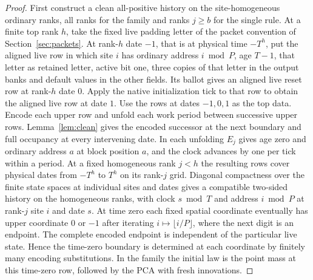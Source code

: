 \begin{proof}
First construct a clean all-positive history on the site-homogeneous ordinary ranks, all ranks for the family and ranks \(j\ge b\) for the single rule. At a finite top rank \(h\), take the fixed live padding letter of the packet convention of Section~\ref{sec:packets}. At rank-\(h\) date \(-1\), that is at physical time \(-T^h\), put the aligned live row in which site \(i\) has ordinary address \(i\bmod P\), age \(T-1\), that letter as retained letter, active bit one, three copies of that letter in the output banks and default values in the other fields. Its ballot gives an aligned live reset row at rank-\(h\) date \(0\). Apply the native initialization tick to that row to obtain the aligned live row at date \(1\). Use the rows at dates \(-1,0,1\) as the top data. Encode each upper row and unfold each work period between successive upper rows. Lemma~\ref{lem:clean} gives the encoded successor at the next boundary and full occupancy at every intervening date. In each unfolding \(E_j\) gives age zero and ordinary address \(a\) at block position \(a\), and the clock advances by one per tick within a period. At a fixed homogeneous rank \(j<h\) the resulting rows cover physical dates from \(-T^h\) to \(T^h\) on its rank-\(j\) grid. Diagonal compactness over the finite state spaces at individual sites and dates gives a compatible two-sided history on the homogeneous ranks, with clock \(s\bmod T\) and address \(i\bmod P\) at rank-\(j\) site \(i\) and date \(s\). At time zero each fixed spatial coordinate eventually has upper coordinate \(0\) or \(-1\) after iterating \(i\mapsto\lfloor i/P\rfloor\), where the next digit is an endpoint. The complete encoded endpoint is independent of the particular live state. Hence the time-zero boundary is determined at each coordinate by finitely many encoding substitutions. In the family the initial law is the point mass at this time-zero row, followed by the PCA with fresh innovations.


\end{proof}
